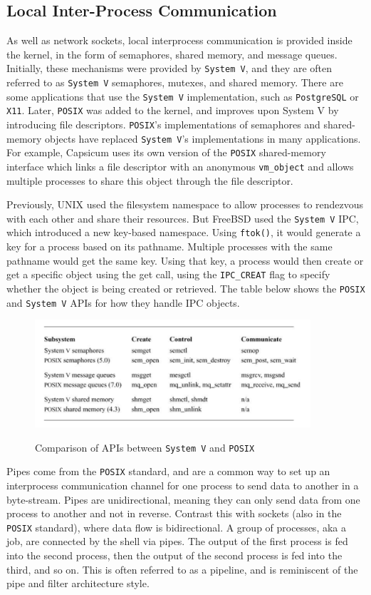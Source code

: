 \documentclass[12pt, dvipsnames, a4paper]{article}
\newcommand{\code}[1]{\texttt{#1}}
\begin{document}
\subsection{Local Inter-Process Communication}
As well as network sockets, local interprocess communication is provided inside the kernel, in the form of semaphores, shared memory, and message queues. Initially, these mechanisms were provided by \code{System V}, and they are often referred to as \code{System V} semaphores, mutexes, and shared memory. There are some applications that use the \code{System V} implementation, such as \code{PostgreSQL} or \code{X11}. Later, \code{POSIX} was added to the kernel, and improves upon System V by introducing file descriptors. \code{POSIX}’s implementations of semaphores and shared-memory objects have replaced \code{System V}’s implementations in many applications. For example, Capsicum uses its own version of the \code{POSIX} shared-memory interface which links a file descriptor with an anonymous \code{vm\_object} and allows multiple processes to share this object through the file descriptor.

Previously, UNIX used the filesystem namespace to allow processes to rendezvous with each other and share their resources. But FreeBSD used the \code{System V} IPC, which introduced a new key-based namespace. Using \code{ftok()}, it would generate a key for a process based on its pathname. Multiple processes with the same pathname would get the same key. Using that key, a process would then create or get a specific object using the get call, using the \code{IPC\_CREAT} flag to specify whether the object is being created or retrieved. The table below shows the \code{POSIX} and \code{System V} APIs for how they handle IPC objects.

\begin{figure}[!htb]
	\centering
	\includegraphics[width=290pt]{assets/localipc1.png}
	\caption{Comparison of APIs between \code{System V} and \code{POSIX}} \cite{mckusick}
\end{figure}

Pipes come from the \code{POSIX} standard, and are a common way to set up an interprocess communication channel for one process to send data to another in a byte-stream. Pipes are unidirectional, meaning they can only send data from one process to another and not in reverse. Contrast this with sockets (also in the \code{POSIX} standard), where data flow is bidirectional. A group of processes, aka a job, are connected by the shell via pipes. The output of the first process is fed into the second process, then the output of the second process is fed into the third, and so on. This is often referred to as a pipeline, and is reminiscent of the pipe and filter architecture style.
\end{document}
